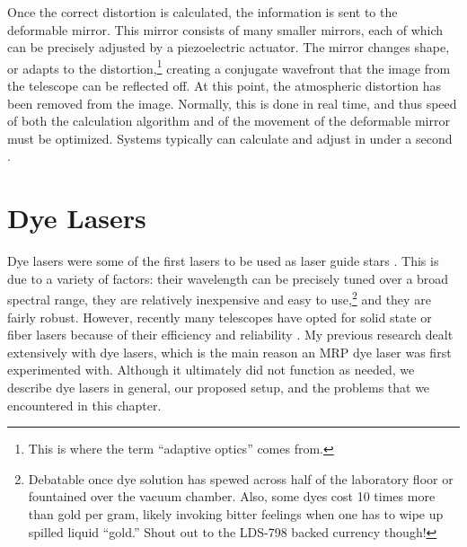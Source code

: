 Once the correct distortion is calculated, the information is sent to the deformable mirror. This mirror consists of many smaller mirrors, each of which can be precisely adjusted by a piezoelectric actuator. The mirror changes shape, or adapts to the distortion,\footnote{This is where the term ``adaptive optics'' comes from.} creating a conjugate wavefront that the image from the telescope can be reflected off. At this point, the atmospheric distortion has been removed from the image. Normally, this is done in real time, and thus speed of both the calculation algorithm and of the movement of the deformable mirror must be optimized. Systems typically can calculate and adjust in under a second \cite{Wizinowich2006}.





\chapter{Dye Lasers}
Dye lasers were some of the first lasers to be used as laser guide stars \cite{Primmerman1991}. This is due to a variety of factors: their wavelength can be precisely tuned over a broad spectral range, they are relatively inexpensive and easy to use,\footnote{Debatable once dye solution has spewed across half of the laboratory floor or fountained over the vacuum chamber. Also, some dyes cost 10 times more than gold per gram, likely invoking bitter feelings when one has to wipe up spilled liquid ``gold.'' Shout out to the LDS-798 backed currency though!} and they are fairly robust. However, recently many telescopes have opted for solid state or fiber lasers because of their efficiency and reliability \cite{Wizinowich2006}. My previous research dealt extensively with dye lasers, which is the main reason an MRP dye laser was first experimented with. Although it ultimately did not function as needed, we describe dye lasers in general, our proposed setup, and the problems that we encountered in this chapter.

